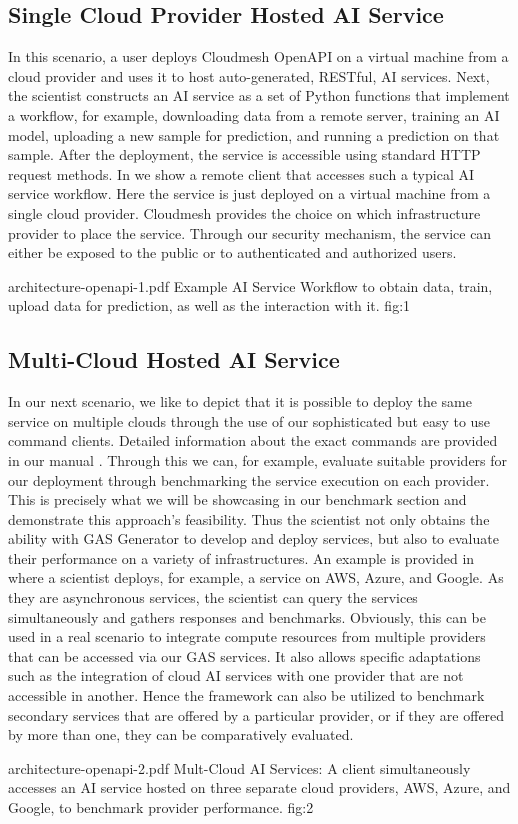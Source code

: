 \subsection{Single Cloud Provider Hosted AI Service}

In this scenario, a user deploys Cloudmesh OpenAPI on a virtual machine from a cloud provider and uses it to host auto-generated, RESTful, AI services. Next, the scientist constructs an AI service as a set of Python functions that implement a workflow, for example, downloading data from a remote server, training an AI model, uploading a new sample for prediction, and running a prediction on that sample. After the deployment, the service is accessible using
standard HTTP request methods. In  we show a remote client
that accesses such a typical AI service workflow.
Here the service is just deployed on a virtual
machine from a single cloud provider. Cloudmesh provides the
choice on which infrastructure provider to place the service. Through our security mechanism, the service can either be exposed to the public or to authenticated and authorized users.

\OneFIGURE
  {architecture-openapi-1.pdf}
  {Example AI Service Workflow to obtain data, train, upload data for prediction, as well as the interaction with it.}
  {fig:1}

\subsection{Multi-Cloud Hosted AI Service}

In our next scenario, we like to depict that it is possible to deploy the same service on multiple clouds through the use of our sophisticated but easy to use command clients. Detailed information about the exact commands are provided in our manual \cite{cloudmesh-manual}. Through this we can, for example, evaluate suitable providers for our deployment through benchmarking the service execution on each provider. This is precisely what we will be showcasing in our benchmark section and demonstrate this approach's feasibility. Thus the scientist not only obtains the ability with GAS Generator to develop and deploy services, but also to evaluate their performance on a variety of infrastructures. An example is provided in  where a scientist deploys, for example, a service on AWS, Azure, and Google. As they are asynchronous services, the scientist can query the services simultaneously and
gathers responses and benchmarks. Obviously, this can be used in a real scenario to  integrate compute resources from multiple providers that can be accessed via our GAS services. It also allows specific adaptations such as the integration of cloud AI services with one provider that are not accessible in another. Hence the framework can also be utilized to benchmark secondary services that are offered by a particular provider, or if they are offered by more than one, they can be comparatively evaluated. 


\OneFIGURE
  {architecture-openapi-2.pdf}
  {Mult-Cloud AI Services: A client simultaneously accesses an AI service hosted
   on three separate cloud providers, AWS, Azure, and Google, to benchmark
   provider performance.}
  {fig:2}
 